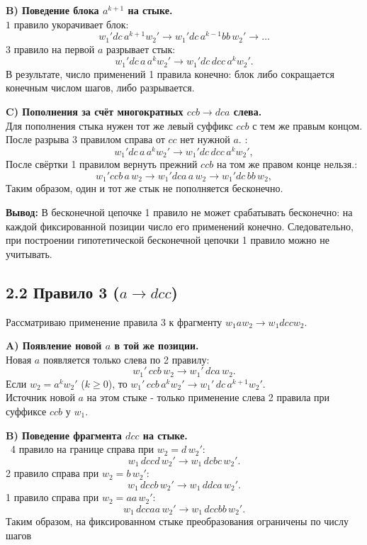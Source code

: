 \documentclass[12pt,a4paper]{article}
\begin{document}
\textbf{B) Поведение блока \(a^{k+1}\) на стыке.}\\
\(1\) правило укорачивает блок:
\[
w_1'dc\,a^{k+1}w_2' \to w_1'dc\,a^{k-1}bb\,w_2' \to \dots
\]
\(3\) правило на первой \(a\) разрывает стык:
\[
w_1'dc\,a\,a^{k}w_2' \to w_1'dc\,dcc\,a^{k}w_2'.
\]
В результате, число применений 1 правила конечно: блок либо сокращается конечным числом шагов, либо разрывается.

\textbf{C) Пополнения за счёт многократных \(ccb \to dca\) слева.}\\
Для пополнения стыка нужен тот же левый суффикс \(ccb\) с тем же правым концом. После разрыва 3 правилом справа от \(cc\) нет нужной \(a\). :
\[
w_1'dc\,a\,a^{k}w_2' \to w_1'dc\,dcc\,a^{k}w_2',
\]
После свёртки 1 правилом вернуть прежний \(ccb\) на том же правом конце нельзя.:
\[
w_1'ccb\,a\,w_2 \to w_1'dca\,a\,w_2 \to w_1'dc\,bb\,w_2,
\]
Таким образом, один и тот же стык не пополняется бесконечно.

\textbf{Вывод:}
В бесконечной цепочке 1 правило не может срабатывать бесконечно: на каждой фиксированной позиции число его применений конечно. Следовательно, при построении гипотетической бесконечной цепочки 1 правило можно не учитывать.

\subsection*{2.2 Правило 3 (\(a \to dcc\))}

Рассматриваю применение правила 3 к фрагменту \(w_1a w_2 \to w_1dcc w_2\).

\textbf{A) Появление новой \(a\) в той же позиции.}\\
Новая \(a\) появляется только слева по 2 правилу:
\[
w_1' \, ccb \, w_2 \to w_1' \, dca \, w_2.
\]
Если \(w_2 = a^{k} w_2'\) (\(k\ge 0\)), то
\(
w_1' \, ccb \, a^{k} w_2' \to w_1' \, dc \, a^{k+1} w_2'.
\)\\
Источник новой \(a\) на этом стыке - только применение слева 2 правила при суффиксе \(ccb\) у \(w_1\).

\textbf{B) Поведение фрагмента \(dcc\) на стыке.}\\\
4 правило на границе справа при \(w_2 = d\,w_2'\):
\[
w_1 \, dccd \, w_2' \to w_1 \, dcbc \, w_2'.
\]
2 правило справа при \(w_2 = b\,w_2'\):
\[
w_1 \, dccb \, w_2' \to w_1 \, ddca \, w_2'.
\]
1 правило справа при \(w_2 = aa\,w_2'\):
\[
w_1 \, dccaa \, w_2' \to w_1 \, dccbb \, w_2'.
\]
Таким образом, на фиксированном стыке преобразования ограничены по числу шагов
\end{document}
